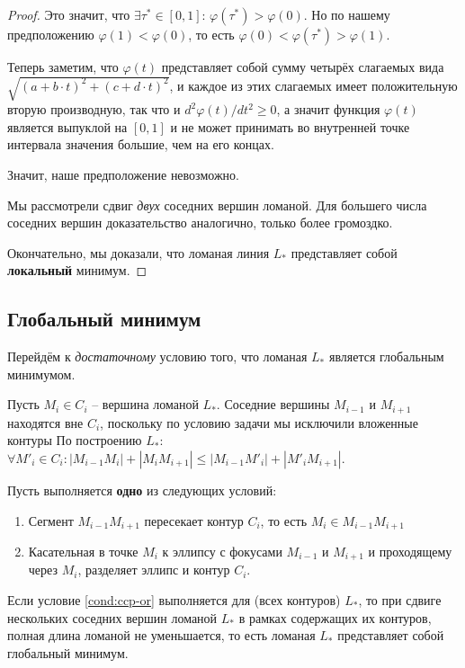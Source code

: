 \begin{proof}
Это значит, что
$\exists \tau^* \in [0,1]$:
$\varphi(\tau^*) > \varphi(0)$.
Но по нашему предположению
$\varphi(1)<\varphi(0)$,
то есть
$\varphi(0)<\varphi(\tau^*)>\varphi(1)$.

Теперь заметим, что
$\varphi(t)$
представляет собой сумму четырёх слагаемых вида
$\sqrt{(a+b\cdot t)^2 + (c+d \cdot t)^2}$,
и каждое из этих слагаемых имеет
положительную вторую производную,
так что и
$d^2\varphi(t)/dt^2 \geqslant 0$,
а значит функция
$\varphi(t)$
является выпуклой на
$[0,1]$
и не может принимать
во внутренней точке интервала
значения большие,
чем на его концах.

Значит,
наше предположение невозможно.

Мы рассмотрели сдвиг \textit{двух}
соседних вершин ломаной.
Для большего числа соседних вершин
доказательство аналогично,
только более громоздко.

Окончательно,
мы доказали, что ломаная линия
$L_*$
представляет собой
\textbf{локальный}
минимум.
\end{proof}

\subsection{Глобальный минимум}

Перейдём к \textit{достаточному}
условию того,
что ломаная
$L_*$
является глобальным минимумом.

Пусть
$M_i \in C_i$ --
вершина ломаной
$L_*$.
Соседние вершины
$M_{i-1}$
и
$M_{i+1}$
находятся вне
$C_i$,
поскольку по условию задачи
мы исключили вложенные контуры
По построению
$L_*$:
$\forall M'_i \in C_i:
|M_{i-1} M_i|+|M_i M_{i+1}|
\leqslant
|M_{i-1} M'_i|+|M'_i M_{i+1}|
$.

\begin{condition}
  \label{cond:ccp-or}
Пусть выполняется
\textbf{одно}
из следующих условий:
\begin{enumerate}
  \item
  Сегмент
  $M_{i-1} M_{i+1}$
  пересекает контур
  $C_i$,
  то есть
  $M_i \in M_{i-1} M_{i+1}$
  \item
  Касательная в точке
  $M_i$
  к эллипсу с фокусами
  $M_{i-1}$
  и
  $M_{i+1}$
  и проходящему через
  $M_i$,
  разделяет эллипс и контур
  $C_i$.
\end{enumerate}
\end{condition}

\begin{proposition}
Если условие
\ref{cond:ccp-or}
выполняется для
(всех контуров)
$L_*$,
то
при сдвиге нескольких соседних вершин ломаной
$L_*$
в рамках содержащих их контуров,
полная длина ломаной не уменьшается,
то есть ломаная
$L_*$
представляет собой глобальный минимум.
\end{proposition}

